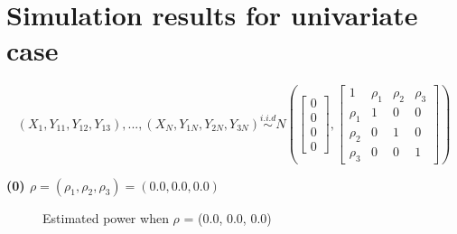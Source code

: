 \documentclass[12pt]{report}
\begin{document}
 





\newpage
\section{Simulation results for univariate case}

\begin{equation} 
\label{eq:latent}
(X_1, Y_{11}, Y_{12}, Y_{13}), ... , (X_N, Y_{1N}, Y_{2N}, Y_{3N})  \overset{i.i.d}{\sim} N \left( \begin{bmatrix} 0 \\ 0 \\ 0 \\ 0 \end{bmatrix}, \begin{bmatrix}1 & \rho_{1} & \rho_{2}&  \rho_{3} \\ \rho_{1} & 1 & 0 & 0 \\ \rho_{2} & 0 & 1 & 0 \\ \rho_{3} & 0 & 0 & 1  \end{bmatrix}  \right)
\end{equation}


\textbf{(0) $\rho = (\rho_{1}, \rho_{2}, \rho_{3}) = (0.0, 0.0, 0.0)$}

\begin{figure}[H]
\captionsetup{format=plain}
\centering
{}
\caption{Estimated power when $\rho$ = (0.0, 0.0, 0.0)}
\label{fig:multi0}    
\end{figure}
\end{document}
